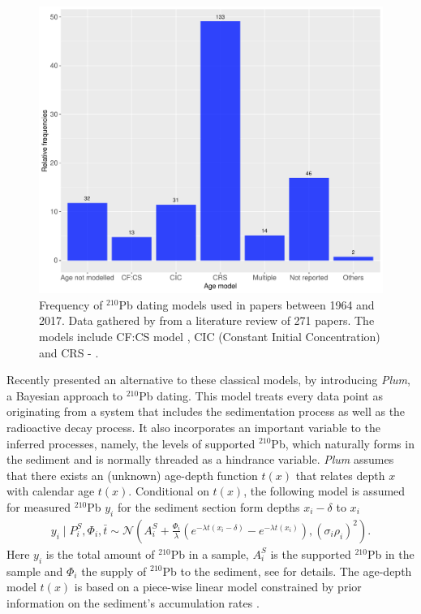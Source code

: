 \documentclass [10pt] {article}
\begin{document}
\begin{figure}[h!]
	\begin{centering}
		\includegraphics[width=.75\linewidth]{210Pbmodels-bar.pdf}
		\caption{Frequency of $^{210}$Pb dating models used in papers between 1964 and 2017. Data gathered by \citet{Courtney2019} from a literature review of 271 papers. The models include CF:CS model \citep[The Constant Flux - Constant Sedimentation;][]{Robbins1978}, CIC (Constant Initial Concentration) \citep{Goldberg1963,Crozaz1964,Robbins1978} and CRS -  \citep[Constant Rate of Supply;][]{Appleby1978,Robbins1978}. }
		\label{fig:210models}
	\end{centering}
\end{figure}

Recently \citet{Aquino2018} presented an alternative to these classical models, by introducing \textit{Plum}, a Bayesian approach to $^{210}$Pb dating.
This model treats every data point as originating from a system that includes the sedimentation process as well as the radioactive decay process. 
It also incorporates an important variable to the inferred processes, namely, the levels of supported $^{210}$Pb, which naturally forms in the sediment and is normally threaded as a hindrance variable.
\textit{Plum} assumes that there exists an (unknown) age-depth function $t(x)$ that relates depth $x$ with calendar age $t(x)$.  Conditional on $t(x)$, the following model is assumed for measured $^{210}$Pb $y_i$ for the sediment section form depths $x_i - \delta$ to $x_i$
\begin{eqnarray}
y_i\mid P^S_i, \Phi_i, \bar{t}\sim \mathcal{N} \left(A^S_i+\frac{\Phi_i}{\lambda} \left( e^{-\lambda t(x_i-\delta)} - e^{-\lambda t(x_i)} \right), (\sigma_i\rho_i)^2 \right). 
\end{eqnarray}
Here $y_i$ is the total amount of $^{210}$Pb in a sample, $A_i^S$ is the supported $^{210}$Pb in the sample and $\Phi_i$ the supply of $^{210}$Pb to the sediment, see \cite{Aquino2018} for details. 
The age-depth model $t(x)$ is based on a piece-wise linear model constrained by prior information on the sediment's accumulation rates  \citep{Blaauw2011}.%
\end{document}
